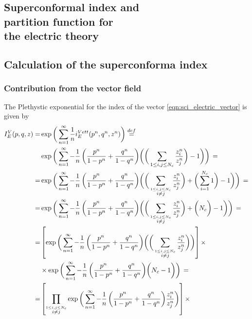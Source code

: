 \begin{appendices}
\chapter{Superconformal index and \\
partition function for
\\ the electric theory}
\label{appendix:index_electric}
\section{Calculation of the superconforma index}
\subsection{Contribution from the vector field}
The Plethystic exponential for the index of the vector \eqref{eqn:sci_electric_vector} is given by
\begin{equation}
\begin{aligned}
I_E^V(p,q,z) = &\exp \bigg( \sum_{n=1}^{\infty} {1 \over n} i_E^{Vett} (p^n,q^n,z^n) \bigg) \overset{def}{=} \\
 &\exp \bigg( \sum_{n=1}^{\infty} - {1 \over n} \, \bigg( {p^n \over 1-p^n} + {q^n \over 1-q^n} \bigg)  \bigg(\bigg( \sum_{ 1 \leq i,j \leq N_c}  {z_i^n \over z_j^n}  \bigg)- 1 \bigg) \bigg) \, = \\
 =&\exp \bigg( \sum_{n=1}^{\infty} - {1 \over n} \, \bigg( {p^n \over 1-p^n} + {q^n \over 1-q^n} \bigg)  \bigg( \bigg( \sum_{\overset{ 1 \leq i,j \leq N_c}{i \neq j}}  {z_i^n \over z_j^n} \bigg) + \bigg( \sum_{i=1}^{N_c} 1 \bigg)- 1 \bigg) \bigg) \, = \\
  =&\exp \bigg( \sum_{n=1}^{\infty} - {1 \over n} \, \bigg( {p^n \over 1-p^n} + {q^n \over 1-q^n} \bigg)  \bigg( \bigg( \sum_{\overset{ 1 \leq i,j \leq N_c}{i \neq j}}  {z_i^n \over z_j^n} \bigg) + \bigg( N_c \bigg)- 1 \bigg) \bigg) \, = \\
    =&
    \left[  \exp \bigg( \sum_{n=1}^{\infty} - {1 \over n} \, \bigg( {p^n \over 1-p^n} + {q^n \over 1-q^n} \bigg)  \bigg( \bigg( \sum_{\overset{ 1 \leq i,j \leq N_c}{i \neq j}}  {z_i^n \over z_j^n} \bigg) \bigg)\right] \times \\
	&   \times \exp \bigg( \sum_{n=1}^{\infty} - {1 \over n} \, \bigg( {p^n \over 1-p^n} + {q^n \over 1-q^n} \bigg)  \bigg( N_c - 1 \bigg) \bigg) \, = 
\\
=& \left[ \prod_{\overset{ 1 \leq i,j \leq N_c}{i\neq j}} \exp \bigg( \sum_{n=1}^{\infty} - {1 \over n} \, \bigg( {p^n \over 1-p^n} + {q^n \over 1-q^n} \bigg)   {z_i^n \over z_j^n}\bigg) \right]\times  \\

\end{aligned}
\end{equation}
\end{appendices}
